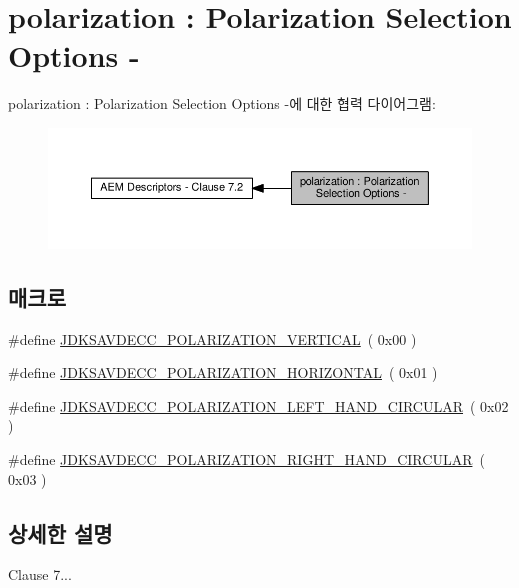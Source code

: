 \hypertarget{group__polarization}{}\section{polarization \+: Polarization Selection Options -\/}
\label{group__polarization}
polarization \+: Polarization Selection Options -\/에 대한 협력 다이어그램\+:
\nopagebreak
\begin{figure}[H]
\begin{center}
\leavevmode
\includegraphics[width=350pt]{group__polarization}
\end{center}
\end{figure}
\subsection*{매크로}
\begin{DoxyCompactItemize}
\item 
\#define \hyperlink{group__polarization_gab439588de0e5bc434e0af73d839e2b0c}{J\+D\+K\+S\+A\+V\+D\+E\+C\+C\+\_\+\+P\+O\+L\+A\+R\+I\+Z\+A\+T\+I\+O\+N\+\_\+\+V\+E\+R\+T\+I\+C\+AL}~( 0x00 )
\item 
\#define \hyperlink{group__polarization_gaacb10ef0efe1f1a11e4065b6bc711cb2}{J\+D\+K\+S\+A\+V\+D\+E\+C\+C\+\_\+\+P\+O\+L\+A\+R\+I\+Z\+A\+T\+I\+O\+N\+\_\+\+H\+O\+R\+I\+Z\+O\+N\+T\+AL}~( 0x01 )
\item 
\#define \hyperlink{group__polarization_ga11c93ba887e006bcf9d96bb0021823e3}{J\+D\+K\+S\+A\+V\+D\+E\+C\+C\+\_\+\+P\+O\+L\+A\+R\+I\+Z\+A\+T\+I\+O\+N\+\_\+\+L\+E\+F\+T\+\_\+\+H\+A\+N\+D\+\_\+\+C\+I\+R\+C\+U\+L\+AR}~( 0x02 )
\item 
\#define \hyperlink{group__polarization_gaa5b279682a93cd9d36f7967cab35756d}{J\+D\+K\+S\+A\+V\+D\+E\+C\+C\+\_\+\+P\+O\+L\+A\+R\+I\+Z\+A\+T\+I\+O\+N\+\_\+\+R\+I\+G\+H\+T\+\_\+\+H\+A\+N\+D\+\_\+\+C\+I\+R\+C\+U\+L\+AR}~( 0x03 )
\end{DoxyCompactItemize}


\subsection{상세한 설명}
Clause 7... 


